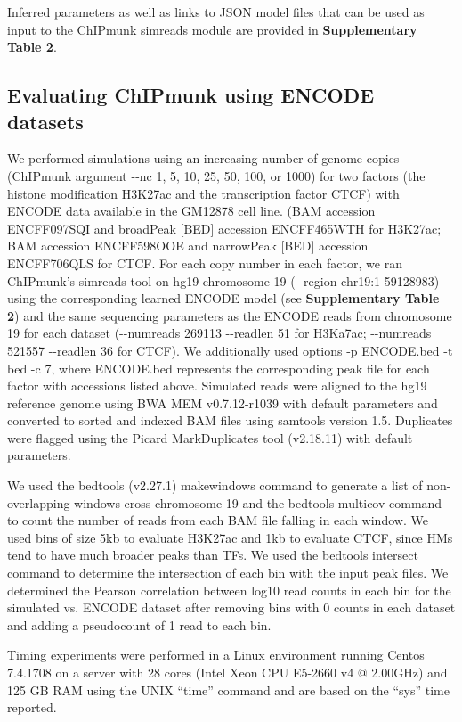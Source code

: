 \documentclass[12pt]{article}
\begin{document}
Inferred parameters as well as links to JSON model files that can be used as input to the ChIPmunk simreads module are provided in \textbf{Supplementary Table 2}.

\subsection*{Evaluating ChIPmunk using ENCODE datasets}

We performed simulations using an increasing number of genome copies (ChIPmunk argument -{}-nc 1, 5, 10, 25, 50, 100, or 1000) for two factors (the histone modification H3K27ac and the transcription factor CTCF) with ENCODE data available in the GM12878 cell line. (BAM accession ENCFF097SQI and broadPeak [BED] accession ENCFF465WTH for H3K27ac; BAM accession ENCFF598OOE and narrowPeak [BED] accession ENCFF706QLS for CTCF.
For each copy number in each factor, we ran ChIPmunk's simreads tool on hg19 chromosome 19 (-{}-region chr19:1-59128983) using the corresponding learned ENCODE model (see \textbf{Supplementary Table 2}) and the same sequencing parameters as the ENCODE reads from chromosome 19 for each dataset (-{}-numreads 269113 -{}-readlen 51 for H3Ka7ac; -{}-numreads 521557 -{}-readlen 36 for CTCF). 
We additionally used options -p ENCODE.bed -t bed -c 7, where ENCODE.bed represents the corresponding peak file for each factor with accessions listed above.
Simulated reads were aligned to the hg19 reference genome using BWA MEM \cite{bwamem} v0.7.12-r1039 with default parameters and converted to sorted and indexed BAM files using samtools \cite{samtools} version 1.5. Duplicates were flagged using the Picard \cite{picard} MarkDuplicates tool (v2.18.11) with default parameters.

We used the bedtools \cite{bedtools} (v2.27.1) makewindows command to generate a list of non-overlapping windows cross chromosome 19 and the bedtools multicov command to count the number of reads from each BAM file falling in each window. We used bins of size 5kb to evaluate H3K27ac and 1kb to evaluate CTCF, since HMs tend to have much broader peaks than TFs.
We used the bedtools intersect command to determine the intersection of each bin with the input peak files. We determined the Pearson correlation between log10 read counts in each bin for the simulated vs. ENCODE dataset after removing bins with 0 counts in each dataset and adding a pseudocount of 1 read to each bin.

Timing experiments were performed in a Linux environment running Centos 7.4.1708 on a server with 28 cores (Intel\textsuperscript{\textregistered} Xeon\textsuperscript{\textregistered} CPU E5-2660 v4 @ 2.00GHz) and 125 GB RAM using the UNIX ``time'' command and are based on the ``sys'' time reported. 
\end{document}
